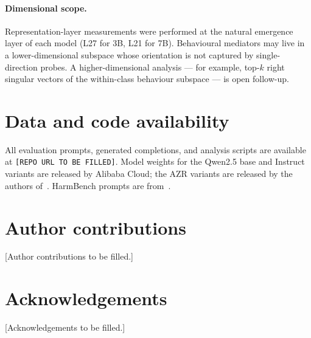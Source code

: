 \documentclass[11pt,a4paper]{article}
\begin{document}
\paragraph{Dimensional scope.}
Representation-layer measurements were performed at the natural
emergence layer of each model (L27 for 3B, L21 for 7B). Behavioural
mediators may live in a lower-dimensional subspace whose orientation
is not captured by single-direction probes. A higher-dimensional
analysis — for example, top-$k$ right singular vectors of the
within-class behaviour subspace — is open follow-up.

\section*{Data and code availability}

All evaluation prompts, generated completions, and analysis scripts are
available at \texttt{[REPO URL TO BE FILLED]}. Model weights for the
Qwen2.5 base and Instruct variants are released by Alibaba Cloud; the
AZR variants are released by the authors of~\citep{zhao2024azr}.
HarmBench prompts are from~\citep{mazeika2024harmbench}.

\section*{Author contributions}

[Author contributions to be filled.]

\section*{Acknowledgements}

[Acknowledgements to be filled.]


\end{document}
